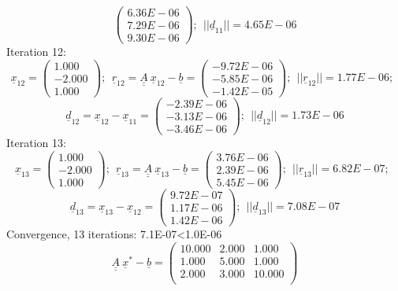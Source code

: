 \documentclass{report}[10pts]
\begin{document}
\begin{small}
\[   \begin{pmatrix}
   6.36E-06 \\ 7.29E-06 \\ 9.30E-06
   \end{pmatrix}
;~~
||
\underline{d}_{11}
||=
4.65E-06
\]
Iteration 12:
\[
\underline{x}_{12}=
   \begin{pmatrix}
   1.000 \\ -2.000 \\ 1.000
   \end{pmatrix}
;~~
\underline{r}_{12}=
\underline{\underline{A}}~\underline{x}_{12}-
\underline{b}=
   \begin{pmatrix}
   -9.72E-06 \\ -5.85E-06 \\ -1.42E-05
   \end{pmatrix}
;~~
||
\underline{r}_{12}
||=
1.77E-06
;~~
\]
\[
\underline{d}_{12}=
\underline{x}_{12}-
\underline{x}_{11}=
   \begin{pmatrix}
   -2.39E-06 \\ -3.13E-06 \\ -3.46E-06
   \end{pmatrix}
;~~
||
\underline{d}_{12}
||=
1.73E-06
\]
Iteration 13:
\[
\underline{x}_{13}=
   \begin{pmatrix}
   1.000 \\ -2.000 \\ 1.000
   \end{pmatrix}
;~~
\underline{r}_{13}=
\underline{\underline{A}}~\underline{x}_{13}-
\underline{b}=
   \begin{pmatrix}
   3.76E-06 \\ 2.39E-06 \\ 5.45E-06
   \end{pmatrix}
;~~
||
\underline{r}_{13}
||=
6.82E-07
;~~
\]
\[
\underline{d}_{13}=
\underline{x}_{13}-
\underline{x}_{12}=
   \begin{pmatrix}
   9.72E-07 \\ 1.17E-06 \\ 1.42E-06
   \end{pmatrix}
;~~
||
\underline{d}_{13}
||=
7.08E-07
\]
Convergence, 13 iterations: 7.1E-07<1.0E-06
\[
   \underline{\underline{A}}~\underline{x}^*-\underline{b}=
      \begin{pmatrix}
         10.000 & 2.000 & 1.000\\
         1.000 & 5.000 & 1.000\\
         2.000 & 3.000 & 10.000\\
      \end{pmatrix}
\]
\end{small}
\end{document}
